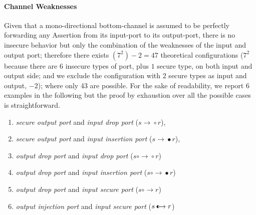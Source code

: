 \documentclass[conference]{IEEEtran}
\newcommand*\halfbullet[1][0.4ex]{%
  \begin{tikzpicture}
	  \raisebox{0.6pt}{\draw[fill] (0,0)-- (90:#1) arc (90:270:#1) -- cycle ;
	  \draw (0,0) circle (#1);}
  \end{tikzpicture}}
\newcommand{\sdcom}{\mathrel{\rightarrow\!\!\circ}}
\newcommand{\sicom}{\mathrel{\rightarrow\!\!\bullet}}
\newcommand{\ddcom}{\mathrel{\circ\!\!\rightarrow\!\!\circ}}
\newcommand{\dicom}{\mathrel{\circ\!\!\rightarrow\!\!\bullet}}
\newcommand{\dscom}{\mathrel{\circ\!\!\rightarrow}}
\newcommand{\jscom}{\mathrel{\halfbullet\!\!\rightarrow}}
\begin{document}
\paragraph{Channel Weaknesses}
Given that a mono-directional bottom-channel is assumed to be perfectly
forwarding any Assertion from its input-port to its output-port, there is no
insecure behavior but only the combination of the weaknesses of the input and
output port; therefore there exists $(7^2)-2=47$ theoretical configurations
($7^2$ because there are $6$ insecure types of port, plus $1$ secure type, on
both input and output side; and we exclude the configuration with $2$ secure
types as input and output, $-2$); where only 43 are possible. For the sake of
readability, we report 6 examples in the following but the proof by exhaustion
over all the possible cases is straightforward.

\begin{enumerate}[start=6, label={W\arabic*)}]
	\item \emph{secure output port} and \emph{input drop port} ($s\sdcom r$), 
	\item \emph{secure output port} and \emph{input insertion port} ($s\sicom r$), 
	\item \emph{output drop port} and \emph{input drop port} ($s\ddcom r$)
	\item \emph{output drop port} and \emph{input insertion port} ($s\dicom r$)
	\item \emph{output drop port} and \emph{input secure port} ($s\dscom r$)
	\item \emph{output injection port} and \emph{input secure port} ($s\jscom r$)
\end{enumerate}
\end{document}
